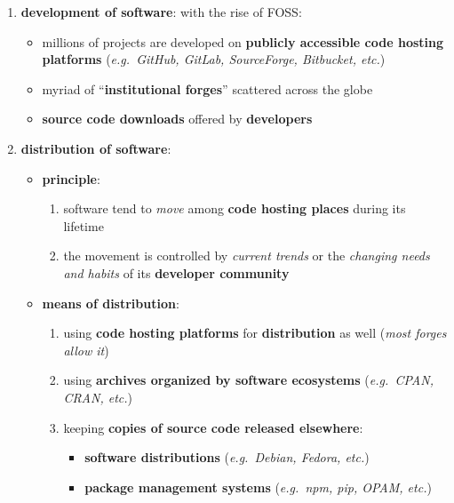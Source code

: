 \documentclass[11pt]{article}
\providecommand{\tightlist}{%
      \setlength{\itemsep}{0pt}\setlength{\parskip}{0pt}}
\begin{document}
\begin{enumerate}
\def\labelenumi{\arabic{enumi}.}
\tightlist
\item
  \textbf{development of software}: with the rise of FOSS:

  \begin{itemize}
  \tightlist
  \item
    millions of projects are developed on \textbf{publicly accessible
    code hosting platforms} (\emph{e.g.~GitHub, GitLab, SourceForge,
    Bitbucket, etc.})
  \item
    myriad of ``\textbf{institutional forges}'' scattered across the
    globe
  \item
    \textbf{source code downloads} offered by \textbf{developers}
  \end{itemize}
\item
  \textbf{distribution of software}:

  \begin{itemize}
  \tightlist
  \item
    \textbf{principle}:

    \begin{enumerate}
    \def\labelenumii{\arabic{enumii}.}
    \tightlist
    \item
      software tend to \emph{move} among \textbf{code hosting places}
      during its lifetime
    \item
      the movement is controlled by \emph{current trends} or the
      \emph{changing needs and habits} of its \textbf{developer
      community}
    \end{enumerate}
  \item
    \textbf{means of distribution}:

    \begin{enumerate}
    \def\labelenumii{\arabic{enumii}.}
    \tightlist
    \item
      using \textbf{code hosting platforms} for \textbf{distribution} as
      well (\emph{most forges allow it})
    \item
      using \textbf{archives organized by software ecosystems}
      (\emph{e.g.~CPAN, CRAN, etc.})
    \item
      keeping \textbf{copies of source code released elsewhere}:

      \begin{itemize}
      \tightlist
      \item
        \textbf{software distributions} (\emph{e.g.~Debian, Fedora,
        etc.})
      \item
        \textbf{package management systems} (\emph{e.g.~npm, pip, OPAM,
        etc.})
      \end{itemize}
    \end{enumerate}
  \end{itemize}
\end{enumerate}
\end{document}

